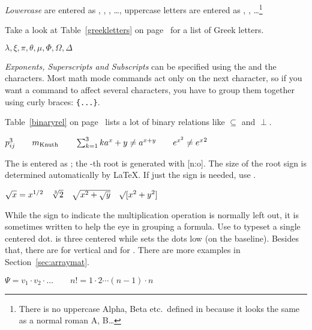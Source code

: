 \emph{Lowercase } are entered as ,
, , \ldots, uppercase letters
are entered as , , \ldots\footnote{There is no
  uppercase Alpha, Beta etc.\ defined in \LaTeXe{} because it looks the same as a
  normal roman A, B\ldots{}}

Take a look at Table~\ref{greekletters} on page~\pageref{greekletters} for a
list of Greek letters.
\begin{example}
$\lambda,\xi,\pi,\theta,
 \mu,\Phi,\Omega,\Delta$
\end{example}


\emph{Exponents, Superscripts and Subscripts} can be specified using%
the \ai{\^} and the \ai{\_} characters.
Most math mode commands act only on the next character, so if you
want a command to affect several characters, you have to group them
together using curly braces: \verb|{...}|.

Table~\ref{binaryrel} on page~\pageref{binaryrel} lists a lot of binary
relations like $\subseteq$ and $\perp$.

\begin{example}
$p^3_{ij} \qquad 
 m_\text{Knuth}\qquad
\sum_{k=1}^3 k \\[5pt]
 a^x+y \neq a^{x+y}\qquad 
 e^{x^2} \neq {e^x}^2$
\end{example}


The \emph{} is entered as ; the
-th root is generated with [n:o]. The size of
the root sign is determined automatically by \LaTeX. If just the sign
is needed, use .

\begin{example}
$\sqrt{x} = x^{1/2}
 \quad \sqrt[3]{2}
 \quad \sqrt{x^{2} + \sqrt{y}}
 \quad \surd[x^2 + y^2]$
\end{example}


While the \emph{} sign to indicate%
the multiplication operation is normally left out, it is sometimes written
to help the eye in grouping a formula.
Use  to typeset a single centered dot.  is
three centered \emph{} while  sets the dots low (on the
baseline). Besides that, there are  for
vertical and  for . There are more examples in
Section~\ref{sec:arraymat}.
\begin{example}
$\Psi = v_1 \cdot v_2
 \cdot \ldots \qquad 
 n! = 1 \cdot 2 
 \cdots (n-1) \cdot n$
\end{example}

